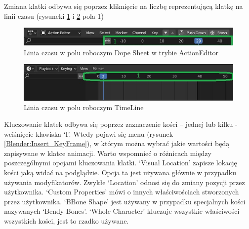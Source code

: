 \documentclass[12pt,twoside]{article}
\begin{document}
Zmiana klatki odbywa się poprzez kliknięcie na liczbę reprezentującą klatkę na
linii czasu (rysuneki \ref{Blender:TimeLine_a} i \ref{Blender:TimeLine_b} pola 1)
\begin{figure}[ht!]
    \centering
    \includegraphics[width=12cm]{BlenderPict/TimeLine1.jpg}
    \caption{Linia czasu w polu roboczym Dope Sheet w trybie ActionEditor}
    \label{Blender:TimeLine_a}
\end{figure}

\begin{figure}[ht!]
    \centering
    \includegraphics[width=12cm]{BlenderPict/TimeLine2.jpg}
    \caption{Linia czasu w polu roboczym TimeLine}
    \label{Blender:TimeLine_b}
\end{figure}


Kluczowanie klatek odbywa się  poprzez zaznaczenie kości -- jednej lub kilku -
wciśnięcie klawiska `I'. Wtedy pojawi się menu (rysunek
\ref{Blender:Insert_KeyFrame}), w którym można wybrać jakie wartości będą
zapisywane w klatce animacji. Warto wspomnieć o różnicach między poszczególnymi
opcjami kluczowania klatki. `Visual Location' zapisze lokację kości jaką widać
na podglądzie. Opcja ta jest używana głównie w przypadku używania modyfikatorów.
Zwykłe `Location' odnosi się do zmiany pozycji przez użytkownika. `Custom
Properties' mówi o innych właściwościach stworzonych przez użytkownika. `BBone
Shape' jest używany w przypadku specjalnych kości nazywanych `Bendy Bones'.
`Whole Character' kluczuje wszystkie właściwości wszystkich kości, jest to
rzadko używane.
\end{document}

